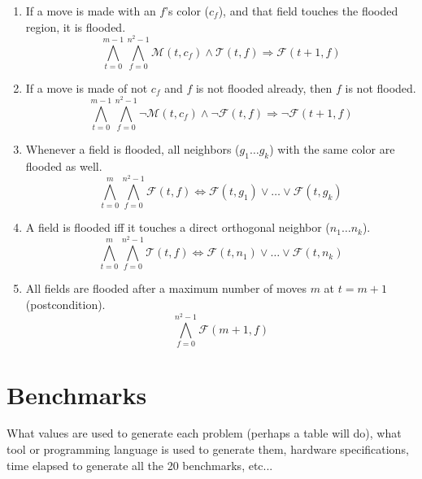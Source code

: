 \documentclass[conference]{IEEEtran}
\newcommand{\nMoves}{\ensuremath{m}\xspace}
\newcommand{\bSize}{\ensuremath{n}\xspace}
\newcommand{\clr}{\ensuremath{c}\xspace}
\newcommand{\flood}[2]{\ensuremath{\mathcal{F}(#1,#2)}\xspace}
\newcommand{\move}[2]{\ensuremath{\mathcal{M}(#1,#2)}\xspace}
\newcommand{\touch}[2]{\ensuremath{\mathcal{T}(#1,#2)}\xspace}
\newcommand{\turn}{\ensuremath{t}\xspace}
\newcommand{\field}{\ensuremath{f}\xspace}
\begin{document}
\begin{enumerate}
	\item If a move is made with an \field's color ($\clr_\field$), and that field touches the flooded region, it is flooded.
	\begin{equation}
	\bigwedge_{\turn=0}^{\nMoves-1}
	\bigwedge_{\field=0}^{{\bSize^2}-1}
	\move{\turn}{\clr_\field}\wedge\touch{\turn}{\field}\Rightarrow\flood{\turn+1}{\field}
	\end{equation}
	\item If a move is made of not  $\clr_\field$ and \field is not flooded already, then \field is not flooded.
	\begin{equation}
	\bigwedge_{\turn=0}^{\nMoves-1}
	\bigwedge_{\field=0}^{{\bSize^2}-1}
	\neg\move{\turn}{\clr_\field}\wedge\neg\flood{\turn}{\field}\Rightarrow\neg\flood{\turn+1}{\field}
	\end{equation}
	\item Whenever a field is flooded, all neighbors ($g_1\dots g_k$) with the same color are flooded as well.
	\begin{equation}
	\bigwedge_{\turn=0}^{\nMoves}
	\bigwedge_{\field=0}^{{\bSize^2}-1}
	\flood{\turn}{\field}\Leftrightarrow\flood{\turn}{g_1}\vee\dots\vee\flood{\turn}{g_k}
	\end{equation} 
	\item A field is flooded iff it touches a direct orthogonal neighbor ($\bSize_1\dots \bSize_k$).
	\begin{equation}
	\bigwedge_{\turn=0}^{\nMoves}
	\bigwedge_{\field=0}^{{\bSize^2}-1}
	\touch{\turn}{\field}\Leftrightarrow\flood{\turn}{n_1}\vee\dots\vee\flood{\turn}{n_k}
	\end{equation} 
	\item All fields are flooded after a maximum number of moves \nMoves at $\turn=\nMoves+1$ (postcondition).
	\begin{equation}
	\bigwedge_{\field=0}^{{\bSize^2}-1}
	\flood{\nMoves+1}{\field}
	\end{equation} 
\end{enumerate}
\section{Benchmarks}
What values are used to generate each problem (perhaps a table will do), what tool or programming language is used to generate them, hardware specifications, time elapsed to generate all the 20 benchmarks, etc...


\end{document}
